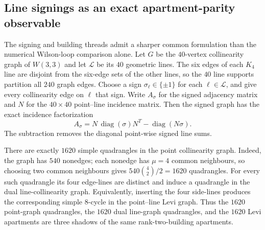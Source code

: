 \subsection{Line signings as an exact apartment-parity observable}
\label{sec:pass4461-line-signing-apartment}

The signing and building threads admit a sharper common formulation than the
numerical Wilson-loop comparison alone.  Let $G$ be the $40$-vertex
collinearity graph of $W(3,3)$ and let $\mathcal L$ be its $40$ geometric
lines.  The six edges of each $K_4$ line are disjoint from the six-edge sets of
the other lines, so the $40$ line supports partition all $240$ graph edges.
Choose a sign $\sigma_\ell\in\{\pm1\}$ for each $\ell\in\mathcal L$, and give
every collinearity edge on $\ell$ that sign.  Write $A_\sigma$ for the signed
adjacency matrix and $N$ for the $40\times40$ point--line incidence matrix.
Then the signed graph has the exact incidence factorization
\begin{equation}
 \boxed{
 A_\sigma=N\,\operatorname{diag}(\sigma)N^{T}
           -\operatorname{diag}(N\sigma).}
 \label{eq:pass4461-incidence-factorization}
\end{equation}
The subtraction removes the diagonal point-wise signed line sums.

There are exactly $1620$ simple quadrangles in the point collinearity graph.
Indeed, the graph has $540$ nonedges; each nonedge has $\mu=4$ common
neighbours, so choosing two common neighbours gives
$540\binom42/2=1620$ quadrangles.  For every such quadrangle its four edge-lines
are distinct and induce a quadrangle in the dual line-collinearity graph.
Equivalently, inserting the four side-lines produces the corresponding simple
$8$-cycle in the point--line Levi graph.  Thus the $1620$ point-graph
quadrangles, the $1620$ dual line-graph quadrangles, and the $1620$ Levi
apartments are three shadows of the same rank-two-building apartments.


